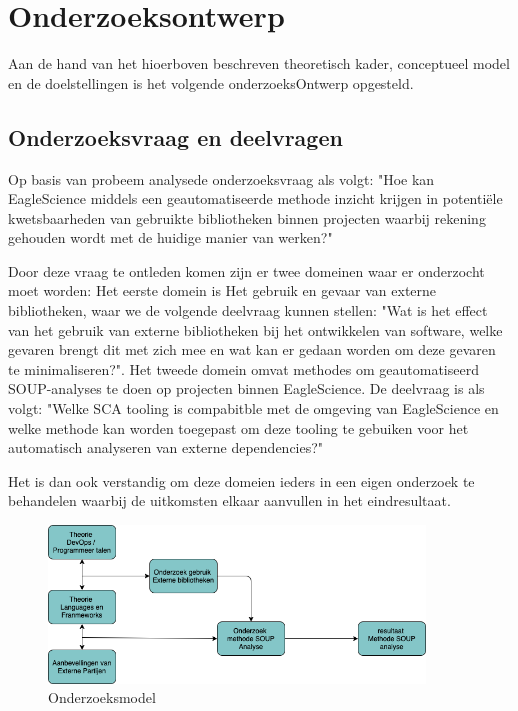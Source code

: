 \section{Onderzoeksontwerp}\label{sec:OP_onderzoeksontwerp}
Aan de hand van het hioerboven beschreven theoretisch kader, conceptueel model en de doelstellingen is het volgende onderzoeksOntwerp opgesteld.

\subsection{Onderzoeksvraag en deelvragen}\label{subsec:onderzoeksvraag-en-deelvragen}
Op basis van probeem analysede onderzoeksvraag als volgt: "Hoe kan EagleScience middels een geautomatiseerde methode inzicht krijgen in potentiële kwetsbaarheden van gebruikte bibliotheken binnen projecten waarbij rekening gehouden wordt met de huidige manier van werken?"

Door deze vraag te ontleden komen zijn er twee domeinen waar er onderzocht moet worden:
Het eerste domein is Het gebruik en gevaar van externe bibliotheken, waar we de volgende deelvraag kunnen stellen: "Wat is het effect van het gebruik van externe bibliotheken bij het ontwikkelen van software, welke gevaren brengt dit met zich mee en wat kan er gedaan worden om deze gevaren te minimaliseren?". Het tweede domein omvat methodes om geautomatiseerd SOUP-analyses te doen op projecten binnen EagleScience. De deelvraag is als volgt: "Welke SCA tooling is compabitble met de omgeving van EagleScience en welke methode kan worden toegepast om deze tooling te gebuiken voor het automatisch analyseren van externe dependencies?"


Het is dan ook verstandig om deze domeien ieders in een eigen onderzoek te behandelen waarbij de uitkomsten elkaar aanvullen in het eindresultaat.

\begin{figure}[H]
    \myfloatalign
    \includegraphics[width=10cm]{gfx/Onderzoekmodel}
    \caption{Onderzoeksmodel}
    \label{fig:OnderzoeksModel}
\end{figure}

